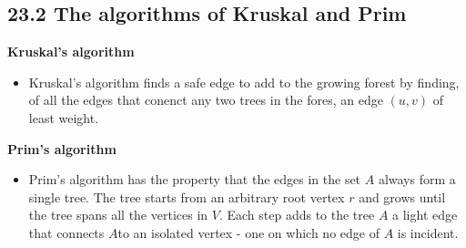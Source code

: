 \documentclass{report}
\begin{document}
\subsection*{23.2 The algorithms of Kruskal and Prim}
\textbf{Kruskal's algorithm}
\begin{itemize}
    \item Kruskal's algorithm finds a safe edge to add to the growing forest by finding, of all the edges that conenct any two trees in the fores, an edge $(u, v)$ of least weight.
\end{itemize}
\textbf{Prim's algorithm}
\begin{itemize}
    \item Prim's algorithm has the property that the edges in the set $A$ always form a single tree. The tree starts from an arbitrary root vertex $r$ and grows until the tree spans all the vertices in $V$. Each step adds to the tree $A$ a light edge that connects $A$to an isolated vertex - one on which no edge of $A$ is incident.
\end{itemize}
\end{document}
